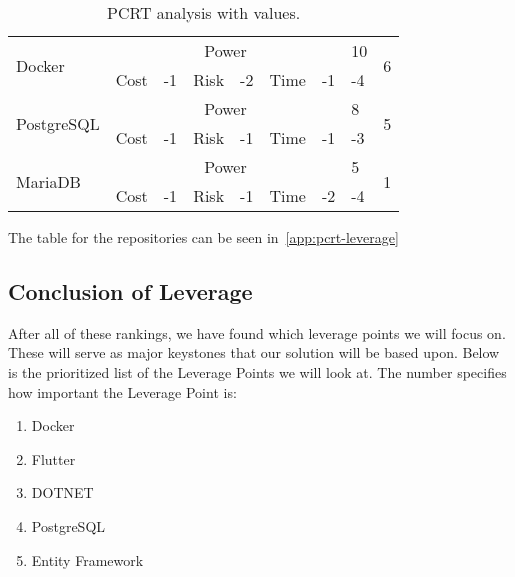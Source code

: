 \begin{table}[h]
{\begin{tabular}{|l|l|l|l|l|l|l|l|c|l|}
    \multirow{2}{*}{Docker} & \multicolumn{6}{c|}{Power} & 10 & \multicolumn{2}{c|}{\multirow{2}{*}{6}} \\ \cline{2-8}
     & Cost & -1 & Risk & -2 & Time & -1 & -4 & \multicolumn{2}{c|}{} \\ \hline
    \multirow{2}{*}{PostgreSQL} & \multicolumn{6}{c|}{Power} & 8 & \multicolumn{2}{c|}{\multirow{2}{*}{5}} \\ \cline{2-8}
     & Cost & -1 & Risk & -1 & Time & -1 & -3 & \multicolumn{2}{c|}{} \\ \hline
    \multirow{2}{*}{MariaDB} & \multicolumn{6}{c|}{Power} & 5 & \multicolumn{2}{c|}{\multirow{2}{*}{1}} \\ \cline{2-8}
     & Cost & -1 & Risk & -1 & Time & -2 & -4 & \multicolumn{2}{c|}{} \\ \hline
    \end{tabular}
    }
    \caption{PCRT analysis with values.}
    \label{tab:pcrt-technologies-leverage}
\end{table}

The table for the repositories can be seen in~\autoref{app:pcrt-leverage}

\subsection{Conclusion of Leverage}
After all of these rankings, we have found which leverage points we will focus on.
These will serve as major keystones that our solution will be based upon.
Below is the prioritized list of the Leverage Points we will look at.
The number specifies how important the Leverage Point is:

\begin{enumerate}
    \item Docker
    \item Flutter
    \item DOTNET
    \item PostgreSQL
    \item Entity Framework
\end{enumerate}
